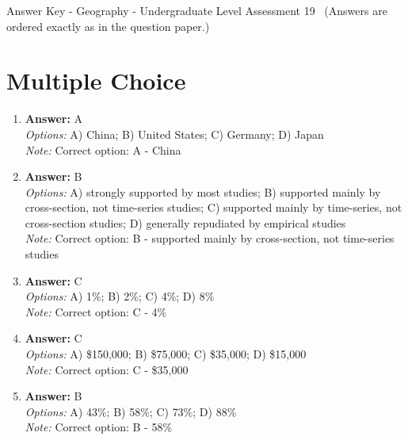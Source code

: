 \documentclass[12pt]{article}
\begin{document}
\begin{center}
Answer Key - Geography - Undergraduate Level Assessment 19 \
\small (Answers are ordered exactly as in the question paper.)
\end{center}

\section*{Multiple Choice}
\begin{enumerate}[label=\arabic*.]
\item \textbf{Answer:} A
\\ \textit{Options:} A) China; B) United States; C) Germany; D) Japan
\\ \textit{Note:} Correct option: A - China
\item \textbf{Answer:} B
\\ \textit{Options:} A) strongly supported by most studies; B) supported mainly by cross-section, not time-series studies; C) supported mainly by time-series, not cross-section studies; D) generally repudiated by empirical studies
\\ \textit{Note:} Correct option: B - supported mainly by cross-section, not time-series studies
\item \textbf{Answer:} C
\\ \textit{Options:} A) 1\%; B) 2\%; C) 4\%; D) 8\%
\\ \textit{Note:} Correct option: C - 4\%
\item \textbf{Answer:} C
\\ \textit{Options:} A) \$150,000; B) \$75,000; C) \$35,000; D) \$15,000
\\ \textit{Note:} Correct option: C - \$35,000
\item \textbf{Answer:} B
\\ \textit{Options:} A) 43\%; B) 58\%; C) 73\%; D) 88\%
\\ \textit{Note:} Correct option: B - 58\%
\end{enumerate}
\end{document}
